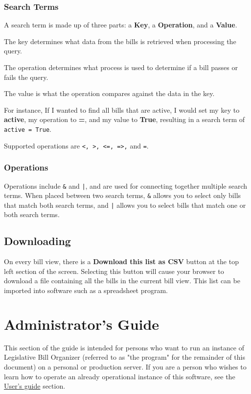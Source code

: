 \documentclass{article}
\begin{document}
\subsubsection{Search Terms}

A search term is made up of three parts: a \textbf{Key}, a \textbf{Operation}, and a \textbf{Value}.

The key determines what data from the bills is retrieved when processing the query.

The operation determines what process is used to determine if a bill passes or fails the query.

The value is what the operation compares against the data in the key.

For instance, If I wanted to find all bills that are active, I would set my key to \textbf{active}, my operation to \textbf{=}, and my value to \textbf{True}, resulting in a search term of \verb"active = True".

Supported operations are \verb"<, >, <=, =>," and \verb"=".

\subsubsection{Operations}

Operations include \verb"&" and \verb"|", and are used for connecting together multiple search terms. When placed between two search terms, \verb"&" allows you to select only bills that match both search terms, and \verb"|" allows you to select bills that match one or both search terms.

\subsection{Downloading}
On every bill view, there is a \textbf{Download this list as CSV} button at the top left section of the screen. Selecting this button will cause your browser to download a file containing all the bills in the current bill view. This list can be imported into software such as a spreadsheet program.

\pagebreak

\section{Administrator's Guide}

This section of the guide is intended for persons who want to run an instance of Legislative Bill Organizer (referred to as "the program" for the remainder of this document) on a personal or production server. If you are a person who wishes to learn how to operate an already operational instance of this software, see the \hyperref[sec:user]{User's guide} section.
\end{document}
